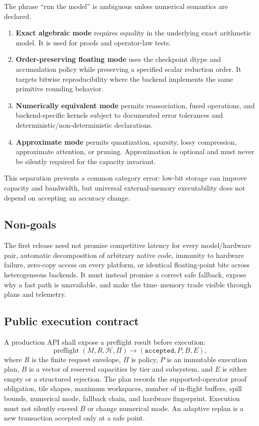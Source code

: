 The phrase ``run the model'' is ambiguous unless numerical semantics are declared.

\begin{enumerate}
  \item \textbf{Exact algebraic mode} requires equality in the underlying exact arithmetic model. It is used for proofs and operator-law tests.
  \item \textbf{Order-preserving floating mode} uses the checkpoint dtype and accumulation policy while preserving a specified scalar reduction order. It targets bitwise reproducibility where the backend implements the same primitive rounding behavior.
  \item \textbf{Numerically equivalent mode} permits reassociation, fused operations, and backend-specific kernels subject to documented error tolerances and deterministic/non-deterministic declarations.
  \item \textbf{Approximate mode} permits quantization, sparsity, lossy compression, approximate attention, or pruning. Approximation is optional and must never be silently required for the capacity invariant.
\end{enumerate}

This separation prevents a common category error: low-bit storage can improve capacity and bandwidth, but universal external-memory executability does not depend on accepting an accuracy change.

\subsection{Non-goals}

The first release need not promise competitive latency for every model/hardware pair, automatic decomposition of arbitrary native code, immunity to hardware failure, zero-copy access on every platform, or identical floating-point bits across heterogeneous backends. It must instead promise a correct safe fallback, expose why a fast path is unavailable, and make the time--memory trade visible through plans and telemetry.

\subsection{Public execution contract}

A production API shall expose a preflight result before execution:
\[
  \operatorname{preflight}(M,R,\mathcal H,\Pi)
  \longrightarrow
  (\texttt{accepted}, P, B, E),
\]
where $R$ is the finite request envelope, $\Pi$ is policy, $P$ is an immutable execution plan, $B$ is a vector of reserved capacities by tier and subsystem, and $E$ is either empty or a structured rejection. The plan records the supported-operator proof obligation, tile shapes, maximum workspaces, number of in-flight buffers, spill bounds, numerical mode, fallback chain, and hardware fingerprint. Execution must not silently exceed $B$ or change numerical mode. An adaptive replan is a new transaction accepted only at a safe point.
